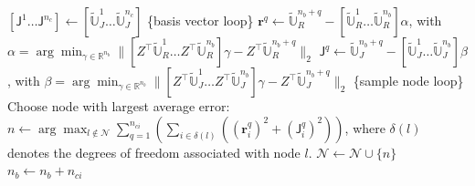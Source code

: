 \documentclass[11pt]{article}
\renewcommand{\vec}[1]{\mathbf{#1}}
\begin{document}
\begin{algorithm}[H]
\begin{algorithmic}[1]
                    \STATE $[\mathsf{J}^1 \ldots \mathsf{J}^{n_c}] \gets [\widetilde{\mathbb{U}}_J^1 \ldots \widetilde{\mathbb{U}}_J^{n_c}]$
                    \ELSE
                     \{basis vector loop\}
                    \STATE $\vec{r}^q \gets \widetilde{\mathbb{U}}_R^{n_b+q} - [\widetilde{\mathbb{U}}_R^1 \ldots \widetilde{\mathbb{U}}_R^{n_b}] \alpha$, with $\alpha = \arg \min_{\gamma \in \mathbb{R}^{n_b}} \| [Z^\top \widetilde{\mathbb{U}}_R^1 \ldots Z^\top \widetilde{\mathbb{U}}_R^{n_b}] \gamma - Z^\top \widetilde{\mathbb{U}}_R^{n_b+q} \|_2$
                    \STATE $\mathsf{J}^q \gets \widetilde{\mathbb{U}}_J^{n_b+q} - [\widetilde{\mathbb{U}}_J^1 \ldots \widetilde{\mathbb{U}}_J^{n_b}] \beta$, with $\beta = \arg \min_{\gamma \in \mathbb{R}^{n_b}} \| [Z^\top \widetilde{\mathbb{U}}_J^1 \ldots Z^\top \widetilde{\mathbb{U}}_J^{n_b}] \gamma - Z^\top \widetilde{\mathbb{U}}_J^{n_b+q} \|_2$
                    \ENDFOR
                    \ENDIF
                     \{sample node loop\}
                    \STATE Choose node with largest average error: $n \gets \arg \max_{l \notin \mathcal{N}} \sum_{q=1}^{n_{ci}} \left( \sum_{i \in \delta(l)} \left((\vec{r}_i^q)^2 + (\mathsf{J}_i^q)^2\right) \right)$,
                    \STATE where $\delta(l)$ denotes the degrees of freedom associated with node $l$.
                    \STATE $\mathcal{N} \gets \mathcal{N} \cup \{n\}$
                    \ENDFOR
                    \STATE $n_b \gets n_b + n_{ci}$
                    \ENDFOR
                \end{algorithmic}
            \end{algorithm}




        
\end{document}
